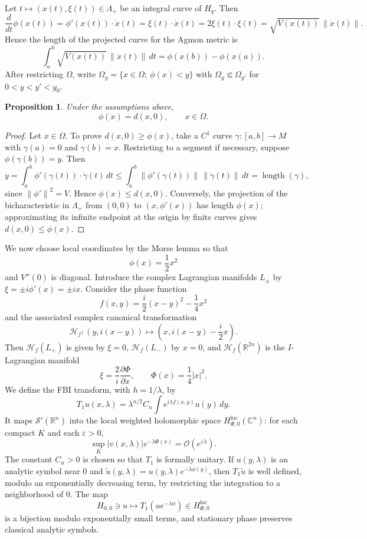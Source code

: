 \documentclass[11pt,a4paper]{article}
\newcommand{\R}{\mathbb R}
\newcommand{\C}{\mathbb C}
\newcommand{\cO}{\mathcal O}
\newcommand{\eps}{\varepsilon}
\newcommand{\norm}[1]{\left\lVert #1\right\rVert}
\numberwithin{equation}{section}
\newtheorem{proposition}[theorem]{Proposition}
\theoremstyle{remark}
\begin{document}
Let $t\mapsto(x(t),\xi(t))\in\Lambda_+$ be an integral curve of $H_q$. Then
\[
\frac d{dt}\phi(x(t))=\phi'(x(t))\cdot\dot x(t)
=\xi(t)\cdot\dot x(t)=2\xi(t)\cdot\xi(t)
=\sqrt{V(x(t))}\,\norm{\dot x(t)}.
\]
Hence the length of the projected curve for the Agmon metric is
\begin{equation}
\int_a^b\sqrt{V(x(t))}\,\norm{\dot x(t)}\,dt
=\phi(x(b))-\phi(x(a)).
\end{equation}
After restricting $\Omega$, write $\Omega_y=\{x\in\Omega;\ \phi(x)<y\}$ with $\Omega_y\Subset\Omega_{y'}$ for $0<y<y'<y_0$.

\begin{proposition}
Under the assumptions above,
\[
\phi(x)=d(x,0),\qquad x\in\Omega.
\]
\end{proposition}
\begin{proof}
Let $x\in\Omega$. To prove $d(x,0)\ge\phi(x)$, take a $C^1$ curve $\gamma:[a,b]\to M$ with $\gamma(a)=0$ and $\gamma(b)=x$. Restricting to a segment if necessary, suppose $\phi(\gamma(b))=y$. Then
\[
y=\int_a^b\phi'(\gamma(t))\cdot\dot\gamma(t)\,dt
\le\int_a^b\norm{\phi'(\gamma(t))}\,\norm{\dot\gamma(t)}\,dt
=\operatorname{length}(\gamma),
\]
since $\norm{\phi'}^2=V$. Hence $\phi(x)\le d(x,0)$. Conversely, the projection of the bicharacteristic in $\Lambda_+$ from $(0,0)$ to $(x,\phi'(x))$ has length $\phi(x)$; approximating its infinite endpoint at the origin by finite curves gives $d(x,0)\le\phi(x)$.
\end{proof}

We now choose local coordinates by the Morse lemma so that
\[
\phi(x)=\frac12x^2
\]
and $V''(0)$ is diagonal. Introduce the complex Lagrangian manifolds $L_\pm$ by $\xi=\pm i\phi'(x)=\pm ix$. Consider the phase function
\[
f(x,y)=\frac i2(x-y)^2-\frac14x^2
\]
and the associated complex canonical transformation
\[
\mathcal H_f:(y,i(x-y))\longmapsto
\left(x,i(x-y)-\frac i2x\right).
\]
Then $\mathcal H_f(L_+)$ is given by $\xi=0$, $\mathcal H_f(L_-)$ by $x=0$, and $\mathcal H_f(\R^{2n})$ is the $I$-Lagrangian manifold
\[
\xi=\frac2i\frac{\partial\Phi}{\partial x},
\qquad \Phi(x)=\frac14|x|^2.
\]
We define the FBI transform, with $h=1/\lambda$, by
\begin{equation}
T_1u(x,\lambda)=\lambda^{n/2}C_n\int e^{i\lambda f(x,y)}u(y)\,dy.
\end{equation}
It maps $\mathcal S'(\R^n)$ into the local weighted holomorphic space $H^{\mathrm{loc}}_{\Phi,0}(\C^n)$: for each compact $K$ and each $\eps>0$,
\[
\sup_K|v(x,\lambda)|e^{-\lambda\Phi(x)}=\cO(e^{\eps\lambda}).
\]
The constant $C_n>0$ is chosen so that $T_1$ is formally unitary. If $u(y,\lambda)$ is an analytic symbol near $0$ and $\widetilde u(y,\lambda)=u(y,\lambda)e^{-\lambda\phi(y)}$, then $T_1\widetilde u$ is well defined, modulo an exponentially decreasing term, by restricting the integration to a neighborhood of $0$. The map
\[
H_{0,0}\ni u\longmapsto T_1(ue^{-\lambda\phi})\in H^{\mathrm{loc}}_{\Phi,0}
\]
is a bijection modulo exponentially small terms, and stationary phase preserves classical analytic symbols.
\end{document}
